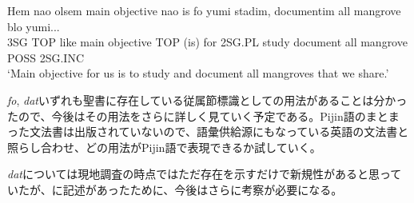 \documentclass[11pt,a4paper]{jsarticle}
\begin{document}
\begin{exe}
\ex
\gll Hem nao olsem main objective nao is fo yumi stadim, documentim all mangrove blo yumi...\\
3SG TOP like main objective TOP (is) for 2SG.PL study document all mangrove POSS 2SG.INC\\
\glt `Main objective for us is to study and document all mangroves that we share.'\citep[20分4秒]{manguru}
\end{exe}

\textit{fo}, \textit{dat}いずれも聖書に存在している従属節標識としての用法があることは分かったので、今後はその用法をさらに詳しく見ていく予定である。Pijin語のまとまった文法書は出版されていない\cite{syntax}ので、語彙供給源にもなっている英語の文法書\cite{english}と照らし合わせ、どの用法がPijin語で表現できるか試していく。

\textit{dat}については現地調査の時点ではただ存在を示すだけで新規性があると思っていたが、\cite{eric}に記述があったために、今後はさらに考察が必要になる。



\end{document}
